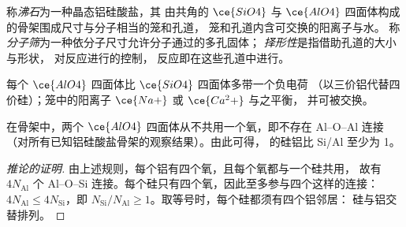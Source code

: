\begin{definition}[沸石]\label{def:b3:inorganic-materials:zeolite}
称\emph{沸石}为一种晶态铝硅酸盐，其
由共角的 $\ce{SiO4}$ 与 $\ce{AlO4}$ 四面体构成的骨架围成尺寸与分子相当的笼和孔道，
笼和孔道内含可交换的阳离子与水。
称\emph{分子筛}为一种依分子尺寸允许分子通过的多孔固体；
\emph{择形性}是指借助孔道的大小与形状，
对反应进行的控制，
反应即在这些孔道中进行。
\end{definition}

每个 $\ce{AlO4}$ 四面体比 $\ce{SiO4}$ 四面体多带一个负电荷
（以三价铝代替四价硅）；笼中的阳离子 $\ce{Na+}$ 或 $\ce{Ca^2+}$ 与之平衡，
并可被交换。

\begin{proposition}[洛文斯坦规则]\label{prop:b3:inorganic-materials:lowenstein}
在骨架中，两个 $\ce{AlO4}$ 四面体从不共用一个氧，即不存在 Al--O--Al 连接
（对所有已知铝硅酸盐骨架的观察结果）。由此可得，
的硅铝比 Si/Al 至少为 1。
\end{proposition}

\begin{proof}[推论的证明]
由上述规则，每个铝有四个氧，且每个氧都与一个硅共用，
故有 $4N_{\mathrm{Al}}$ 个 Al--O--Si 连接。每个硅只有四个氧，因此至多参与四个这样的连接：
$4N_{\mathrm{Al}} \le 4N_{\mathrm{Si}}$，即 $N_{\mathrm{Si}}/N_{\mathrm{Al}} \ge 1$。取等号时，每个硅都须有四个铝邻居：
硅与铝交替排列。
\end{proof}

